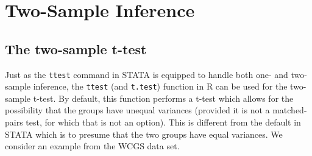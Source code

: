\documentclass[11pt,letterpaper,fleqn]{report}
\begin{document}
\chapter{Two-Sample Inference}

\section{The two-sample t-test}
Just as the \texttt{ttest} command in STATA is equipped to handle both one- and two-sample inference, the \texttt{ttest} (and \texttt{t.test}) function in R can be used for the two-sample t-test. By default, this function performs a t-test which allows for the possibility that the groups have unequal variances (provided it is not a matched-pairs test, for which that is not an option). This is different from the default in STATA which is to presume that the two groups have equal variances. We consider an example from the WCGS data set.\\
\end{document}
